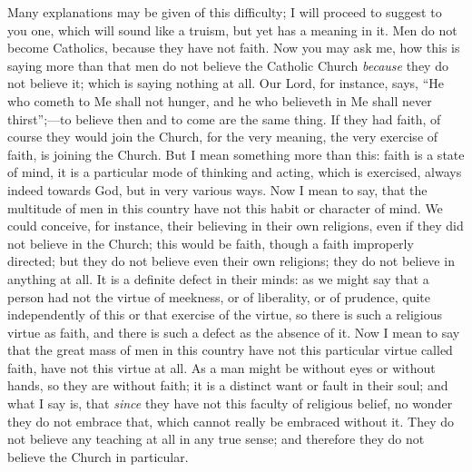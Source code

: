 Many explanations may be given of this difficulty; I will proceed
to suggest to you one, which will sound like a truism, but yet has a
meaning in it. Men do not become Catholics, because they have not
faith. Now you may ask me, how this is saying more than that men do
not believe the Catholic Church \emph{because} they do not believe it;
which is saying nothing at all. Our Lord, for instance, says, ``He
who cometh to Me shall not hunger, and he who believeth in Me shall
never thirst'';—to believe then and to come are the same thing.
If they had faith, of course they would join the Church, for the very
meaning, the very exercise of faith, is joining the Church. But I mean
something more than this: faith is a state of mind, it is a particular
mode of thinking and acting, which is exercised, always indeed towards
God, but in very various ways. Now I mean to say, that the multitude
of men in this country have not this habit or character of mind. We
could conceive, for instance, their believing in their own religions,
even if they did not believe in the Church; this would be faith,
though a faith improperly directed; but they do not believe even their
own religions; they do not believe in anything at all. It is a
definite defect in their minds: as we might say that a person had not
the virtue of meekness, or of liberality, or of prudence, quite
independently of this or that exercise of the virtue, so there is such
a religious virtue as faith, and there is such a defect as the absence
of it. Now I mean to say that the great mass of men in this country
have not this particular virtue called faith, have not this virtue at
all. As a man might be without eyes or without hands, so they are
without faith; it is a distinct want or fault in their soul; and what
I say is, that \emph{since} they have not this faculty of religious belief,
no wonder they do not embrace that, which cannot really be embraced
without it. They do not believe any teaching at all in any true sense;
and therefore they do not believe the Church in particular.

